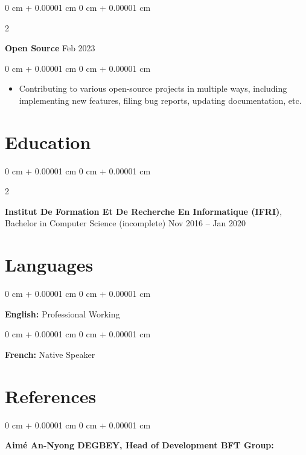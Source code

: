 \documentclass[10pt, letterpaper]{article}
\newenvironment{highlights}{
    \begin{itemize}[
        topsep=0.10 cm,
        parsep=0.10 cm,
        partopsep=0pt,
        itemsep=0pt,
        leftmargin=0 cm + 10pt
    ]
}{
    \end{itemize}
} %
\newenvironment{onecolentry}{
    \begin{adjustwidth}{
        0 cm + 0.00001 cm
    }{
        0 cm + 0.00001 cm
    }
}{
    \end{adjustwidth}
} %
\newenvironment{twocolentry}[2][]{
    \onecolentry
    \def\secondColumn{#2}
    \setcolumnwidth{\fill, 4.5 cm}
    \begin{paracol}{2}
}{
    \switchcolumn \raggedleft \secondColumn
    \end{paracol}
    \endonecolentry
} %
\begin{document}
        
        \begin{twocolentry}{
            Feb 2023
        }
            \textbf{Open Source}\end{twocolentry}

        \vspace{0.10 cm}
        \begin{onecolentry}
            \begin{highlights}
                \item Contributing to various open-source projects in multiple ways, including implementing new features, filing bug reports, updating documentation, etc.
            \end{highlights}
        \end{onecolentry}



    
    \section{Education}



        
        \begin{twocolentry}{
            Nov 2016 – Jan 2020
        }
            \textbf{Institut De Formation Et De Recherche En Informatique (IFRI)}, Bachelor in Computer Science (incomplete)\end{twocolentry}




    
    \section{Languages}



        
        \begin{onecolentry}
            \textbf{English:} Professional Working
        \end{onecolentry}

        \vspace{0.2 cm}

        \begin{onecolentry}
            \textbf{French:} Native Speaker
        \end{onecolentry}


    
    \section{References}



        
        \begin{onecolentry}
            \textbf{Aimé An-Nyong DEGBEY, Head of Development BFT Group:} 
        \end{onecolentry}


    
\end{document}
